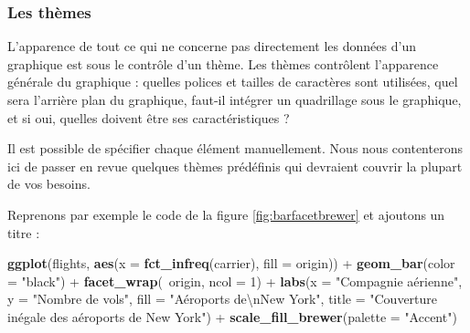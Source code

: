 \documentclass[a4paperpaper,]{article}
\newenvironment{Shaded}{\begin{snugshade}}{\end{snugshade}}
\newcommand{\CharTok}[1]{\textcolor[rgb]{0.57,0.30,0.62}{#1}}
\newcommand{\DataTypeTok}[1]{\textcolor[rgb]{0.00,0.34,0.68}{#1}}
\newcommand{\DecValTok}[1]{\textcolor[rgb]{0.69,0.50,0.00}{#1}}
\newcommand{\KeywordTok}[1]{\textcolor[rgb]{0.12,0.11,0.11}{\textbf{#1}}}
\newcommand{\NormalTok}[1]{\textcolor[rgb]{0.12,0.11,0.11}{#1}}
\newcommand{\OperatorTok}[1]{\textcolor[rgb]{0.12,0.11,0.11}{#1}}
\newcommand{\StringTok}[1]{\textcolor[rgb]{0.75,0.01,0.01}{#1}}
\begin{document}
\hypertarget{les-themes}{%
\subsubsection{Les thèmes}\label{les-themes}}

L'apparence de tout ce qui ne concerne pas directement les données d'un graphique est sous le contrôle d'un thème. Les thèmes contrôlent l'apparence générale du graphique : quelles polices et tailles de caractères sont utilisées, quel sera l'arrière plan du graphique, faut-il intégrer un quadrillage sous le graphique, et si oui, quelles doivent être ses caractéristiques ?

Il est possible de spécifier chaque élément manuellement. Nous nous contenterons ici de passer en revue quelques thèmes prédéfinis qui devraient couvrir la plupart de vos besoins.

Reprenons par exemple le code de la figure \ref{fig:barfacetbrewer} et ajoutons un titre :

\begin{Shaded}
\begin{Highlighting}[]
\KeywordTok{ggplot}\NormalTok{(flights, }\KeywordTok{aes}\NormalTok{(}\DataTypeTok{x =} \KeywordTok{fct_infreq}\NormalTok{(carrier), }\DataTypeTok{fill =}\NormalTok{ origin)) }\OperatorTok{+}
\StringTok{  }\KeywordTok{geom_bar}\NormalTok{(}\DataTypeTok{color =} \StringTok{"black"}\NormalTok{) }\OperatorTok{+}
\StringTok{  }\KeywordTok{facet_wrap}\NormalTok{(}\OperatorTok{~}\NormalTok{origin, }\DataTypeTok{ncol =} \DecValTok{1}\NormalTok{) }\OperatorTok{+}
\StringTok{  }\KeywordTok{labs}\NormalTok{(}\DataTypeTok{x =} \StringTok{"Compagnie aérienne"}\NormalTok{,}
       \DataTypeTok{y =} \StringTok{"Nombre de vols"}\NormalTok{,}
       \DataTypeTok{fill =} \StringTok{"Aéroports de}\CharTok{\textbackslash{}n}\StringTok{New York"}\NormalTok{,}
       \DataTypeTok{title =} \StringTok{"Couverture inégale des aéroports de New York"}\NormalTok{) }\OperatorTok{+}
\StringTok{  }\KeywordTok{scale_fill_brewer}\NormalTok{(}\DataTypeTok{palette =} \StringTok{"Accent"}\NormalTok{)}
\end{Highlighting}
\end{Shaded}
\end{document}
